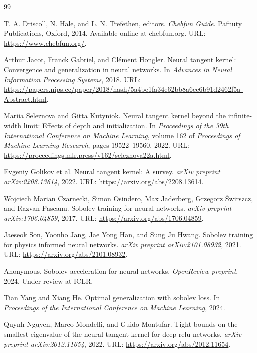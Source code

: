 \documentclass[a4paper]{article}
\theoremstyle{plain}
\theoremstyle{definition}
\theoremstyle{remark}
\begin{document}
\begin{thebibliography}{99}

T. A. Driscoll, N. Hale, and L. N. Trefethen, editors.
\textit{Chebfun Guide}.
Pafnuty Publications, Oxford, 2014.
Available online at chebfun.org. URL: \url{https://www.chebfun.org/}.

Arthur Jacot, Franck Gabriel, and Clément Hongler.
Neural tangent kernel: Convergence and generalization in neural networks.
In \textit{Advances in Neural Information Processing Systems}, 2018.
URL: \url{https://papers.nips.cc/paper/2018/hash/5a4be1fa34e62bb8a6ec6b91d2462f5a-Abstract.html}.

Mariia Seleznova and Gitta Kutyniok.
Neural tangent kernel beyond the infinite-width limit: Effects of depth and initialization.
In \textit{Proceedings of the 39th International Conference on Machine Learning},
volume 162 of \textit{Proceedings of Machine Learning Research}, pages 19522--19560, 2022.
URL: \url{https://proceedings.mlr.press/v162/seleznova22a.html}.

Evgeniy Golikov et al.
Neural tangent kernel: A survey.
\textit{arXiv preprint arXiv:2208.13614}, 2022.
URL: \url{https://arxiv.org/abs/2208.13614}.

Wojciech Marian Czarnecki, Simon Osindero, Max Jaderberg, Grzegorz Świrszcz, and Razvan Pascanu.
Sobolev training for neural networks.
\textit{arXiv preprint arXiv:1706.04859}, 2017.
URL: \url{https://arxiv.org/abs/1706.04859}.

Jaeseok Son, Yoonho Jang, Jae Yong Han, and Sung Ju Hwang.
Sobolev training for physics informed neural networks.
\textit{arXiv preprint arXiv:2101.08932}, 2021.
URL: \url{https://arxiv.org/abs/2101.08932}.

Anonymous.
Sobolev acceleration for neural networks.
\textit{OpenReview preprint}, 2024.
Under review at ICLR.

Tian Yang and Xiang He.
Optimal generalization with sobolev loss.
In \textit{Proceedings of the International Conference on Machine Learning}, 2024.

Quynh Nguyen, Marco Mondelli, and Guido Montufar.
Tight bounds on the smallest eigenvalue of the neural tangent kernel for deep relu networks.
\textit{arXiv preprint arXiv:2012.11654}, 2022.
URL: \url{https://arxiv.org/abs/2012.11654}.


\end{thebibliography}
\end{document}
